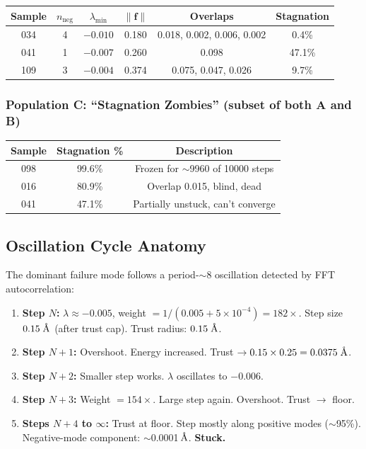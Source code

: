 \documentclass[11pt,a4paper]{article}
\newcommand{\vect}[1]{\mathbf{#1}}
\newcommand{\eval}{\lambda}
\newcommand{\angstrom}{\text{\r{A}}}
\begin{document}
\begin{table}[H]
\centering
\small
\begin{tabular}{cccccc}
\toprule
Sample & $n_\text{neg}$ & $\eval_\text{min}$ & $\|\vect{f}\|$ & Overlaps & Stagnation \\
\midrule
034 & 4 & $-0.010$ & 0.180 & 0.018, 0.002, 0.006, 0.002 & 0.4\% \\
041 & 1 & $-0.007$ & 0.260 & 0.098 & 47.1\% \\
109 & 3 & $-0.004$ & 0.374 & 0.075, 0.047, 0.026 & 9.7\% \\
\bottomrule
\end{tabular}
\end{table}

\subsubsection{Population C: ``Stagnation Zombies'' (subset of both A and B)}

\begin{table}[H]
\centering
\begin{tabular}{ccc}
\toprule
Sample & Stagnation \% & Description \\
\midrule
098 & 99.6\% & Frozen for $\sim$9960 of 10000 steps \\
016 & 80.9\% & Overlap 0.015, blind, dead \\
041 & 47.1\% & Partially unstuck, can't converge \\
\bottomrule
\end{tabular}
\end{table}

\subsection{Oscillation Cycle Anatomy}

The dominant failure mode follows a period-$\sim$8 oscillation detected by FFT autocorrelation:

\begin{enumerate}
  \item \textbf{Step $N$:} $\eval \approx -0.005$, weight $= 1/(0.005 + 5\times10^{-4}) = 182\times$. Step size $0.15\;\angstrom$ (after trust cap). Trust radius: $0.15\;\angstrom$.
  \item \textbf{Step $N\!+\!1$:} Overshoot. Energy increased. Trust $\to 0.15 \times 0.25 = 0.0375\;\angstrom$.
  \item \textbf{Step $N\!+\!2$:} Smaller step works. $\eval$ oscillates to $-0.006$.
  \item \textbf{Step $N\!+\!3$:} Weight $= 154\times$. Large step again. Overshoot. Trust $\to$ floor.
  \item \textbf{Steps $N\!+\!4$ to $\infty$:} Trust at floor. Step mostly along positive modes ($\sim$95\%). Negative-mode component: $\sim$0.0001\,$\angstrom$. \textbf{Stuck.}
\end{enumerate}
\end{document}
